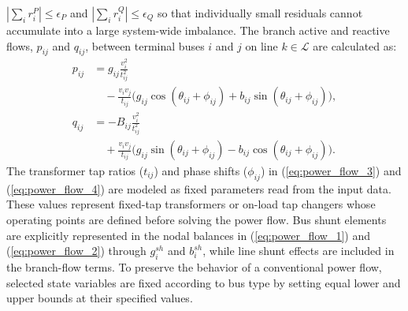 \documentclass[letterpaper,journal]{IEEEtran}
\begin{document}
$|\sum_i r_i^P|\leq\epsilon_P$ and $|\sum_i r_i^Q|\leq\epsilon_Q$ so that individually small residuals cannot accumulate into a
large system-wide imbalance.
The branch active and reactive flows, $p_{ij}$ and $q_{ij}$, between terminal buses $i$ and $j$ on line $k \in \mathcal{L}$ are calculated as:
\begin{align}
	p_{ij} & = g_{ij}\frac{v^2_i}{t^2_{ij}} \nonumber                                                                            \\
	       & \quad - \frac{v_i v_{j}}{t_{ij}} \big( g_{ij}\cos(\theta_{ij}+\phi_{ij}) + b_{ij}\sin(\theta_{ij}+\phi_{ij}) \big),
	\label{eq:power_flow_3}                                                                                                      \\
	q_{ij} & = -B_{ij}\frac{v^2_i}{t^2_{ij}} \nonumber                                                                           \\
	       & \quad + \frac{v_i v_{j}}{t_{ij}} \big( g_{ij}\sin(\theta_{ij}+\phi_{ij}) - b_{ij}\cos(\theta_{ij}+\phi_{ij}) \big).
	\label{eq:power_flow_4}
\end{align}
The transformer tap ratios ($t_{ij}$) and phase shifts ($\phi_{ij}$) in (\ref{eq:power_flow_3}) and (\ref{eq:power_flow_4}) are modeled as
fixed parameters read from the input data. These values represent fixed-tap transformers or on-load tap changers whose operating points are
defined before solving the power flow. Bus shunt elements are explicitly represented in the nodal balances in (\ref{eq:power_flow_1})
and (\ref{eq:power_flow_2}) through $g_i^{sh}$ and $b_i^{sh}$, while line shunt effects are included in the branch-flow terms. To preserve
the behavior of a conventional power flow, selected state variables are fixed according to bus type by setting equal lower and upper bounds at
their specified values.
\end{document}
